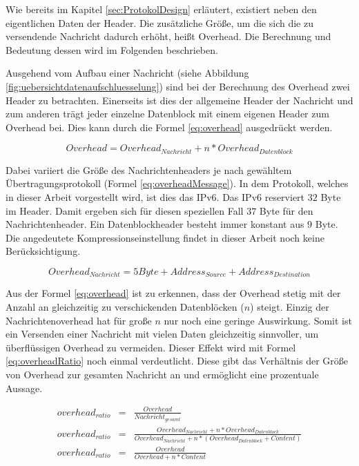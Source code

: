 Wie bereits im Kapitel \ref{sec:ProtokolDesign} erläutert, existiert neben den
eigentlichen Daten der Header. Die zusätzliche Größe, um die sich die
zu versendende Nachricht dadurch erhöht, heißt Overhead. Die Berechnung und
Bedeutung dessen wird im Folgenden beschrieben.

Ausgehend vom Aufbau einer Nachricht (siehe Abbildung
\ref{fig:uebersichtdatenaufschluesselung}) sind bei der Berechnung des Overhead
zwei Header zu betrachten. Einerseits ist dies der allgemeine Header der
Nachricht und zum anderen trägt jeder einzelne Datenblock
mit einem eigenen Header zum Overhead bei. Dies kann durch die Formel
\ref{eq:overhead} ausgedrückt werden.

\begin{equation}
	Overhead = Overhead_{Nachricht} + n * Overhead_{Datenblock}
	\label{eq:overhead}
\end{equation}

Dabei variiert die Größe des Nachrichtenheaders je nach gewähltem
Übertragungsprotokoll (Formel \ref{eq:overheadMessage}). In dem Protokoll,
welches in dieser Arbeit vorgestellt wird, ist dies das IPv6. Das IPv6
reserviert $32$ Byte im Header. Damit ergeben sich für diesen speziellen
Fall $37$ Byte für den Nachrichtenheader. Ein Datenblockheader besteht immer konstant aus $9$ Byte.
Die angedeutete Kompressionseinstellung findet in dieser Arbeit noch
keine Berücksichtigung.

\begin{equation}
	Overhead_{Nachricht} = 5 Byte + Address_{Source} + Address_{Destination}
	\label{eq:overheadMessage}
\end{equation}

Aus der Formel \ref{eq:overhead} ist zu erkennen, dass der Overhead
stetig mit der Anzahl an gleichzeitig zu verschickenden Datenblöcken ($n$)
steigt. Einzig der Nachrichtenoverhead hat für große $n$ nur noch eine
geringe Auswirkung. Somit ist ein Versenden einer Nachricht mit vielen Daten
gleichzeitig sinnvoller, um überflüssigen Overhead zu vermeiden. Dieser
Effekt wird mit Formel \ref{eq:overheadRatio} noch einmal verdeutlicht. Diese
gibt das Verhältnis der Größe von Overhead zur gesamten Nachricht an und
ermöglicht eine prozentuale Aussage.

\begin{eqnarray} 
	overhead_{ratio} & = & \frac{Overhead}{Nachricht_{gesamt}}\\
	overhead_{ratio} & = & \frac{Overhead_{Nachricht} + n *
	Overhead_{Datenblock}}{Overhead_{Nachricht} + n * (Overhead_{Datenblock} + Content)}\\
	overhead_{ratio} & = & \frac{Overhead}{Overhead + n * Content}
	\label{eq:overheadRatio}
\end{eqnarray}
